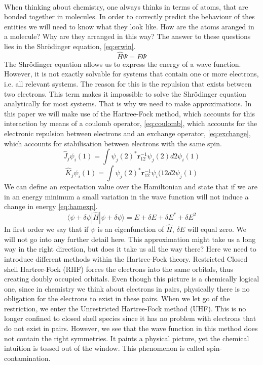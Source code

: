 \documentclass[twoside,twocolumn,9pt]{article}
\begin{document}
\paragraph*{}
When thinking about chemistry, one always thinks in terms of atoms, that are bonded together in molecules. In order to correctly predict the behaviour of 
thes entities we will need to know what they look like. How are the atoms aranged in a molecule? Why are they arranged in this way? The answer to these
questions lies in the Shrödinger equation, \eqref{eq:erwin}.
\begin{equation}\label{eq:erwin}
  \hat{H}\Psi = E\Psi
\end{equation} 
The Shrödinger equation allows us to express the energy of a wave function. However, it is not exactly solvable for systems that contain one or more electrons,
i.e. all relevant systems. The reason for this is the repulsion that exists between two electrons. This term makes it impossible to solve the Shrödinger equation
analytically for most systems. That is why we need to make approximations. In this paper we will make use of the Hartree-Fock method, which accounts for this
interaction by means of a coulomb operator, \eqref{eq:coulomb}, which accounts for the electronic repulsion between electrons and an exchange operator,
\eqref{eq:exchange}, which accounts for stabilisation between electrons with the same spin. 
\begin{equation}\label{eq:coulomb}
  \hat{J}_j\psi_i(1) = \int\psi_j(2)^*\boldsymbol{r}_{12}^{-1}\psi_j(2)d2 \psi_i(1)
\end{equation}
\begin{equation}\label{eq:exchange}
  \hat{K}_j\psi_i(1) = \int\psi_j(2)^*\boldsymbol{r}_{12}^{-1}\psi_i(12d2 \psi_j(1)
\end{equation}
We can define an expectation value over the Hamiltonian and state that if we are in an energy minimum a small variation in the wave function will not induce a change
in energy \eqref{eq:hamexp}.
\begin{equation}\label{eq:hamexp}
  \langle\psi + \delta\psi|\hat{H}|\psi + \delta\psi \rangle = E + \delta E + \delta E^* + \delta E^2
\end{equation}
In first order we say that if $\psi$ is an eigenfunction of $\hat{H}$, $\delta E$ will equal zero. We will not go into any further detail here.
This approximation might take us a long way in the right direction, but does it take us all the way there? Here we need to introduce different methods within the
Hartree-Fock theory. Restricted Closed shell Hartree-Fock (RHF) forces the electrons into the same orbitals, thus creating doubly occupied orbitals. Even though this 
picture is a chemically logical one, since in chemistry we think about electrons in pairs, physically there is no obligation for the electrons to exist in these pairs.
When we let go of the restriction, we enter the Unrestricted Hartree-Fock method (UHF). This  is no longer confined to closed shell species since it has no problem with 
electrons that do not exist in pairs. However, we see that the wave function in this method does not contain the right symmetries. It paints a physical picture, yet the
chemical intuition is tossed out of the window. This phenomenon is called spin-contamination.
\end{document}

